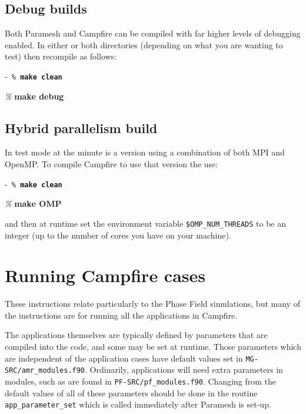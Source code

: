 \documentclass[paper=a4, fontsize=11pt,twoside,bibtotoc]{scrartcl}		%
\newenvironment{codebox}{\begin{center}\begin{MakeFramed}{\hsize0.99\linewidth\advance\hsize-\width\FrameRestore}\tt}{\end{MakeFramed}\end{center}}
\newcommand{\prompt}[1]{\textsl{\%} \textbf{#1}}
\begin{document}
\subsection{Debug builds}

Both Paramesh and Campfire can be compiled with far higher levels of debugging enabled.  In either or both directories (depending on what you are wanting to 
test) then recompile as follows:

\begin{codebox}
        \prompt{make clean}

        \prompt{make debug}
\end{codebox}

\subsection{Hybrid parallelism build}

In test mode at the minute is a version using a combination of both MPI and OpenMP.  To compile Campfire to use that version the use:

\begin{codebox}
        \prompt{make clean}

        \prompt{make OMP}
\end{codebox}
and then at runtime set the environment variable \texttt{\$OMP\_NUM\_THREADS} to be an integer (up to the number of cores you have on your machine).



\section{Running Campfire cases}
								\label{SEC_Running}

These instructions relate particularly to the Phase Field simulations, but many of the instructions are for running all the applications in Campfire.

The applications themselves are typically defined by parameters that are compiled into the code, and some may be set at runtime.  Those parameters which are 
independent of the application cases have default values set in \texttt{MG-SRC/amr\_modules.f90}.  Ordinarily, applications will need extra parameters in 
modules, such as are found in \texttt{PF-SRC/pf\_modules.f90}.  Changing from the default values of all of these parameters should be done in the routine 
\texttt{app\_parameter\_set} which is called immediately after Paramesh is set-up.
\end{document}
